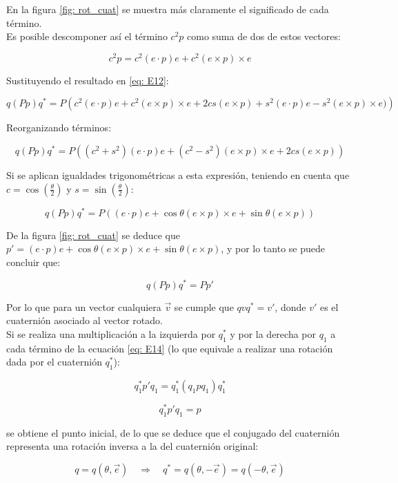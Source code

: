 \documentclass[12pt, a4paper]{report}
\begin{document}
En la figura \ref{fig: rot_cuat} se muestra más claramente el significado de cada término.\\

Es posible descomponer así el término $c^2p$ como suma de dos de estos vectores:

$$ c^2p = c^2(e \cdot p)e + c^2(e \times p) \times e $$

Sustituyendo el resultado en \eqref{eq: E12}:

$$ q(Pp)q^* = P\left(c^2(e \cdot p)e + c^2(e \times p) \times e + 2cs(e \times p) + s^2(e \cdot p)e - s^2(e \times p) \times e)\right) $$

Reorganizando términos:

$$ q(Pp)q^* = P\left((c^2 + s^2)(e \cdot p)e + (c^2 - s^2)(e \times p) \times e + 2cs(e \times p)\right) $$

Si se aplican igualdades trigonométricas a esta expresión, teniendo en cuenta que $c = \cos\left(\frac{\theta}{2}\right)$ y $s = \sin\left(\frac{\theta}{2}\right)$:

$$ q(Pp)q^* = P\left((e \cdot p)e + \cos\theta(e \times p) \times e + \sin\theta(e \times p)\right) $$

De la figura \ref{fig: rot_cuat} se deduce que $ p' = (e \cdot p)e + \cos\theta(e \times p) \times e + \sin\theta(e \times p)$, y por lo tanto se puede concluir que:

$$ q(Pp)q^* = Pp' $$

Por lo que para un vector cualquiera $\vec{v}$ se cumple que $qvq^* = v'$, donde $v'$ es el cuaternión asociado al vector rotado. \\

Si se realiza una multiplicación a la izquierda por $q_1^*$ y por la derecha por $q_1$ a cada término de la ecuación \eqref{eq: E14} (lo que equivale a realizar una rotación dada por el cuaternión $q_1^*$):

\begin{equation}
q_1^*p'q_1 = q_1^*(q_1pq_1)q_1^*
\end{equation}

\begin{equation}
q_1^*p'q_1 = p
\end{equation}

se obtiene el punto inicial, de lo que se deduce que el conjugado del cuaternión representa una rotación inversa a la del cuaternión original:

\begin{equation}
q = q\left(\theta, \vec{e} \right) \quad \Rightarrow \quad q^* = q\left(\theta, -\vec{e} \right) = q\left(-\theta, \vec{e}\right)
\end{equation}
\end{document}
